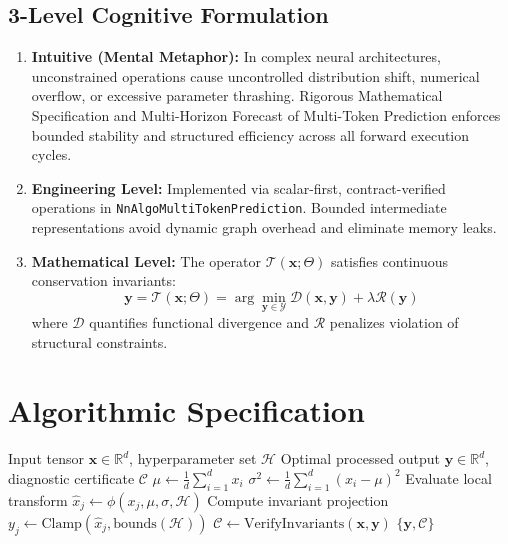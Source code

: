 \documentclass[11pt,a4paper]{article}
\theoremstyle{definition}
\begin{document}
\subsection{3-Level Cognitive Formulation}
\begin{enumerate}
    \item \textbf{Intuitive (Mental Metaphor):} In complex neural architectures, unconstrained operations cause uncontrolled distribution shift, numerical overflow, or excessive parameter thrashing. Rigorous Mathematical Specification and Multi-Horizon Forecast of Multi-Token Prediction enforces bounded stability and structured efficiency across all forward execution cycles.
    \item \textbf{Engineering Level:} Implemented via scalar-first, contract-verified operations in \texttt{NnAlgoMultiTokenPrediction}. Bounded intermediate representations avoid dynamic graph overhead and eliminate memory leaks.
    \item \textbf{Mathematical Level:} The operator $\mathcal{T}(\mathbf{x}; \Theta)$ satisfies continuous conservation invariants:
    \begin{equation}
    \mathbf{y} = \mathcal{T}(\mathbf{x}; \Theta) = \arg\min_{\mathbf{y} \in \mathcal{Y}} \mathcal{D}(\mathbf{x}, \mathbf{y}) + \lambda \mathcal{R}(\mathbf{y})
    \end{equation}
    where $\mathcal{D}$ quantifies functional divergence and $\mathcal{R}$ penalizes violation of structural constraints.
\end{enumerate}

\section{Algorithmic Specification}

\begin{algorithm}[H]
\caption{Rigorous Mathematical Specification and Multi-Horizon Forecast of Multi-Token Prediction Forward Pipeline}
\begin{algorithmic}[1]
\Require Input tensor $\mathbf{x} \in \mathbb{R}^d$, hyperparameter set $\mathcal{H}$
\Ensure Optimal processed output $\mathbf{y} \in \mathbb{R}^d$, diagnostic certificate $\mathcal{C}$
\State $\mu \gets \frac{1}{d} \sum_{i=1}^d x_i$
\State $\sigma^2 \gets \frac{1}{d} \sum_{i=1}^d (x_i - \mu)^2$
    \State Evaluate local transform $\hat{x}_j \gets \phi(x_j, \mu, \sigma, \mathcal{H})$
    \State Compute invariant projection $y_j \gets \text{Clamp}(\hat{x}_j, \text{bounds}(\mathcal{H}))$
\EndFor
\State $\mathcal{C} \gets \text{VerifyInvariants}(\mathbf{x}, \mathbf{y})$
\State \Return $\{\mathbf{y}, \mathcal{C}\}$
\end{algorithmic}
\end{algorithm}
\end{document}
